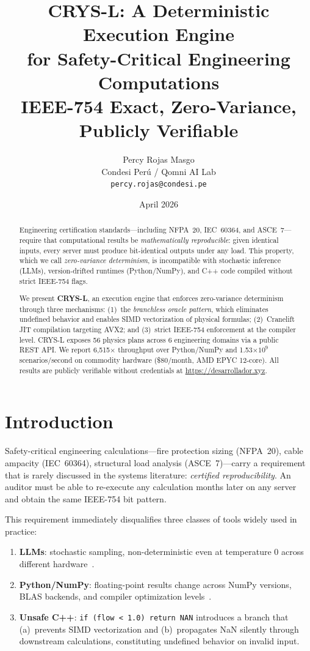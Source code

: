 \documentclass[10pt,twocolumn]{article}
\title{\textbf{CRYS-L: A Deterministic Execution Engine\\for Safety-Critical Engineering Computations}\\
{\large IEEE-754 Exact, Zero-Variance, Publicly Verifiable}}
\author{
  Percy Rojas Masgo \\
  Condesi Per\'{u} / Qomni AI Lab \\
  \texttt{percy.rojas@condesi.pe}
}
\date{April 2026}
\begin{document}
\maketitle

\begin{abstract}
Engineering certification standards---including NFPA~20, IEC~60364, and ASCE~7---require that
computational results be \emph{mathematically reproducible}: given identical inputs, every server
must produce bit-identical outputs under any load. This property, which we call
\emph{zero-variance determinism}, is incompatible with stochastic inference (LLMs), version-drifted
runtimes (Python/NumPy), and C++ code compiled without strict IEEE-754 flags.

We present \textbf{CRYS-L}, an execution engine that enforces zero-variance determinism through
three mechanisms: (1)~the \emph{branchless oracle pattern}, which eliminates undefined behavior
and enables SIMD vectorization of physical formulas; (2)~Cranelift JIT compilation targeting AVX2;
and (3)~strict IEEE-754 enforcement at the compiler level.
CRYS-L exposes 56 physics plans across 6 engineering domains via a public REST API. We report
6{,}515$\times$ throughput over Python/NumPy and 1.53$\times10^9$ scenarios/second on
commodity hardware (\$80/month, AMD EPYC 12-core). All results are publicly verifiable
without credentials at \url{https://desarrollador.xyz}.
\end{abstract}

\section{Introduction}
\label{sec:intro}

Safety-critical engineering calculations---fire protection sizing (NFPA~20), cable ampacity
(IEC~60364), structural load analysis (ASCE~7)---carry a requirement that is rarely discussed in
the systems literature: \emph{certified reproducibility}. An auditor must be able to re-execute
any calculation months later on any server and obtain the same IEEE-754 bit pattern.

This requirement immediately disqualifies three classes of tools widely used in practice:

\begin{enumerate}
\item \textbf{LLMs}: stochastic sampling, non-deterministic even at temperature 0 across different
  hardware~\cite{narayanan2023reproducibility}.
\item \textbf{Python/NumPy}: floating-point results change across NumPy versions, BLAS
  backends, and compiler optimization levels~\cite{goldberg1991floating}.
\item \textbf{Unsafe C++}: \texttt{if (flow < 1.0) return NAN} introduces a branch that
  (a)~prevents SIMD vectorization and (b)~propagates NaN silently through downstream
  calculations, constituting undefined behavior on invalid input.
\end{enumerate}
\end{document}
